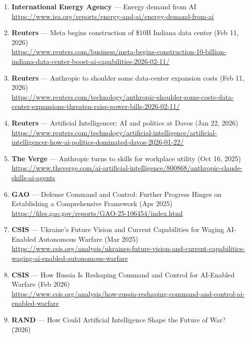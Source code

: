 \documentclass[
]{article}
\begin{document}
\begin{enumerate}
  \url{https://www.reuters.com/technology/spacex-nvidia-deals-showing-ai-runs-capital-2026-02-06/}
\item
  \textbf{International Energy Agency} --- Energy demand from AI\\
  \url{https://www.iea.org/reports/energy-and-ai/energy-demand-from-ai}
\item
  \textbf{Reuters} --- Meta begins construction of \$10B Indiana data
  center (Feb 11, 2026)\\
  \url{https://www.reuters.com/business/meta-begins-construction-10-billion-indiana-data-center-boost-ai-capabilities-2026-02-11/}
\item
  \textbf{Reuters} --- Anthropic to shoulder some data-center expansion
  costs (Feb 11, 2026)\\
  \url{https://www.reuters.com/technology/anthropic-shoulder-some-costs-data-center-expansions-threaten-raise-power-bills-2026-02-11/}
\item
  \textbf{Reuters} --- Artificial Intelligencer: AI and politics at
  Davos (Jan 22, 2026)\\
  \url{https://www.reuters.com/technology/artificial-intelligence/artificial-intelligencer-how-ai-politics-dominated-davos-2026-01-22/}
\item
  \textbf{The Verge} --- Anthropic turns to skills for workplace utility
  (Oct 16, 2025)\\
  \url{https://www.theverge.com/ai-artificial-intelligence/800868/anthropic-claude-skills-ai-agents}
\item
  \textbf{GAO} --- Defense Command and Control: Further Progress Hinges
  on Establishing a Comprehensive Framework (Apr 2025)\\
  \url{https://files.gao.gov/reports/GAO-25-106454/index.html}
\item
  \textbf{CSIS} --- Ukraine's Future Vision and Current Capabilities for
  Waging AI-Enabled Autonomous Warfare (Mar 2025)\\
  \url{https://www.csis.org/analysis/ukraines-future-vision-and-current-capabilities-waging-ai-enabled-autonomous-warfare}
\item
  \textbf{CSIS} --- How Russia Is Reshaping Command and Control for
  AI-Enabled Warfare (Feb 2026)\\
  \url{https://www.csis.org/analysis/how-russia-reshaping-command-and-control-ai-enabled-warfare}
\item
  \textbf{RAND} --- How Could Artificial Intelligence Shape the Future
  of War? (2026)\\

\end{enumerate}
\end{document}
